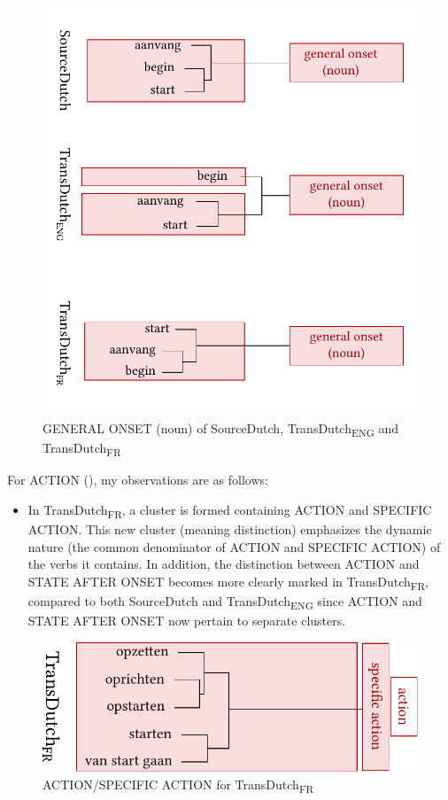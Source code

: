 \begin{figure}
\includegraphics[width=\textwidth]{figures/tree88.pdf}
\caption{\label{fig:4:85}GENERAL ONSET (noun) of SourceDutch, TransDutch\textsubscript{ENG} and TransDutch\textsubscript{FR}}
\end{figure}

For ACTION (), my observations are as follows:

\begin{itemize}
\item  In TransDutch\textsubscript{FR}, a cluster is formed containing ACTION and {SPECIFIC} ACTION. This new cluster (meaning distinction) emphasizes the dynamic nature (the common denominator of ACTION and {SPECIFIC} ACTION) of the verbs it contains. In addition, the distinction between ACTION and STATE AFTER ONSET becomes more clearly marked in TransDutch\textsubscript{FR}, compared to both SourceDutch and TransDutch\textsubscript{ENG} since ACTION and STATE AFTER ONSET now pertain to separate clusters.
\end{itemize}

\begin{figure}
\includegraphics[width=.66\textwidth]{figures/tree89.pdf}
\caption{\label{fig:4:86}ACTION/SPECIFIC ACTION for TransDutch\textsubscript{FR}}
\end{figure}

